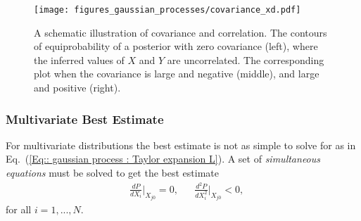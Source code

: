 \documentclass[twoside,english]{uiofysmaster}
\begin{document}
{{\begin{figure}
\centering
\texttt{[image: figures\_gaussian\_processes/covariance\_xd.pdf]}
\caption{A schematic illustration of covariance and correlation. The contours of equiprobability of a posterior with zero covariance (left), where the inferred values of $X$ and $Y$ are uncorrelated. The corresponding plot when the covariance is large and negative (middle), and large and positive (right).}
\label{Fig:: gaussian process : Covariance illustrated}
\end{figure}

\subsubsection{Multivariate Best Estimate}

For multivariate distributions the best estimate is not as simple to solve for as in Eq.~(\ref{Eq:: gaussian process : Taylor expansion L}). A set of \textit{simultaneous equations} must be solved to get the best estimate
\begin{align}\label{Eq:: gaussian process : Best estimate X_i}
&\frac{dP}{dX_i} \Big|_{X_{j0}} =0, &&\frac{d^2P}{dX_i^2} \Big|_{X_{j0}} < 0,
\end{align}
for all $i=1,...,N$.

}}
\end{document}
